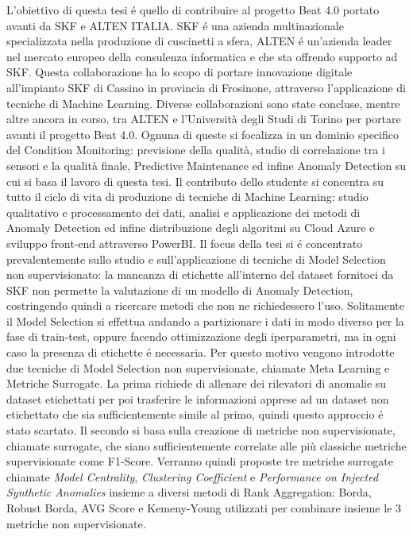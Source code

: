 L’obiettivo di questa tesi é quello di contribuire al progetto Beat 4.0 portato avanti da SKF e ALTEN ITALIA. SKF é una azienda multinazionale specializzata nella produzione di cuscinetti a sfera, ALTEN é un'azienda leader nel mercato europeo della consulenza informatica e che sta offrendo supporto ad SKF. Questa collaborazione ha lo scopo di portare innovazione digitale all'impianto SKF di Cassino in provincia di Frosinone, attraverso l'applicazione di tecniche di Machine Learning.
Diverse collaborazioni sono state concluse, mentre altre ancora in corso, tra ALTEN e l'Università degli Studi di Torino per portare avanti il progetto Beat 4.0. Ognuna di queste si focalizza in un dominio specifico del Condition Monitoring: previsione della qualità, studio di correlazione tra i sensori e la qualità finale, Predictive Maintenance ed infine Anomaly Detection su cui si basa il lavoro di questa tesi.
Il contributo dello studente si concentra su tutto il ciclo di vita di produzione di tecniche di Machine Learning: studio qualitativo e processamento dei dati, analisi e applicazione dei metodi di Anomaly Detection ed infine distribuzione degli algoritmi su Cloud Azure e sviluppo front-end attraverso PowerBI.
Il focus della tesi si é concentrato prevalentemente sullo studio e sull'applicazione di tecniche di Model Selection non supervisionato: la mancanza di etichette all'interno del dataset fornitoci da SKF non permette la valutazione di un modello di Anomaly Detection, costringendo quindi a ricercare metodi che non ne richiedessero l'uso. Solitamente il Model Selection si effettua andando a partizionare i dati in modo diverso per la fase di train-test, oppure facendo ottimizzazione degli iperparametri, ma in ogni caso la presenza di etichette é necessaria. Per questo motivo vengono introdotte due tecniche di Model Selection non supervisionate, chiamate Meta Learning e Metriche Surrogate. La prima richiede di allenare dei rilevatori di anomalie su dataset etichettati per poi trasferire le informazioni apprese ad un dataset non etichettato che sia sufficientemente simile al primo, quindi questo approccio é stato scartato. Il secondo si basa sulla creazione di metriche non supervisionate, chiamate surrogate, che siano sufficientemente correlate alle più classiche metriche supervisionate come F1-Score. Verranno quindi proposte tre metriche surrogate chiamate \textit{Model Centrality}, \textit{Clustering Coefficient} e \textit{Performance on Injected Synthetic Anomalies} insieme a diversi metodi di Rank Aggregation: Borda, Robust Borda, AVG Score e Kemeny-Young utilizzati per combinare insieme le 3 metriche non supervisionate.

